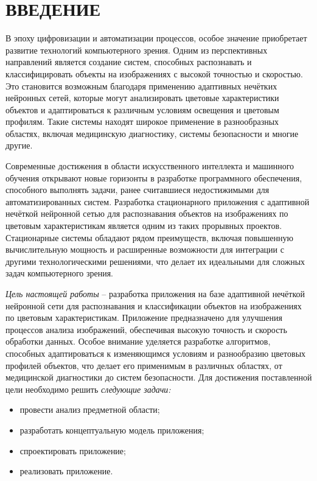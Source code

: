 \section*{ВВЕДЕНИЕ}

В эпоху цифровизации и автоматизации процессов, особое значение приобретает развитие технологий компьютерного зрения. Одним из перспективных направлений является создание систем, способных распознавать и классифицировать объекты на изображениях с высокой точностью и скоростью. Это становится возможным благодаря применению адаптивных нечётких нейронных сетей, которые могут анализировать цветовые характеристики объектов и адаптироваться к различным условиям освещения и цветовым профилям. Такие системы находят широкое применение в разнообразных областях, включая медицинскую диагностику, системы безопасности и многие другие.

Современные достижения в области искусственного интеллекта и машинного обучения открывают новые горизонты в разработке программного обеспечения, способного выполнять задачи, ранее считавшиеся недостижимыми для автоматизированных систем. Разработка стационарного приложения с адаптивной нечёткой нейронной сетью для распознавания объектов на изображениях по цветовым характеристикам является одним из таких прорывных проектов. Стационарные системы обладают рядом преимуществ, включая повышенную вычислительную мощность и расширенные возможности для интеграции с другими технологическими решениями, что делает их идеальными для сложных задач компьютерного зрения.

\emph{Цель настоящей работы} – разработка приложения на базе адаптивной нечёткой нейронной сети для распознавания и классификации объектов на изображениях по цветовым характеристикам. Приложение предназначено для улучшения процессов анализа изображений, обеспечивая высокую точность и скорость обработки данных. Особое внимание уделяется разработке алгоритмов, способных адаптироваться к изменяющимся условиям и разнообразию цветовых профилей объектов, что делает его применимым в различных областях, от медицинской диагностики до систем безопасности. Для достижения поставленной цели необходимо решить \emph{следующие задачи:}
\begin{itemize}
\item провести анализ предметной области;
\item разработать концептуальную модель приложения;
\item спроектировать приложение;
\item реализовать приложение.
\end{itemize}

